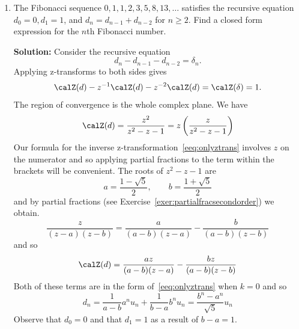 \documentclass[11pt,a4paper]{book}
\theoremstyle{plain}
\numberwithin{equation}{section}
\newcommand{\ints}{{\mathbb Z}}
\newcommand{\term}{\textbf}
\newenvironment{solution}{\begin{footnotesize}\textbf{Solution:}}{\end{footnotesize}}
\newcounter{test}
\newenvironment{excersizelist}{%
  \renewcommand*{\theenumi}{\thechapter.\arabic{enumi}}%
  \newcommand\itemadvanced{\stepcounter{enumi}\item[$\ast$\, \theenumi.]}
  \begin{enumerate}
}{%
  \end{enumerate}
}
\begin{document}
\begin{excersizelist}
\item \label{exer:fibonacci} The Fibonacci sequence $0,1,1,2,3,5,8,13,\dots$ satisfies the recursive equation $d_0 = 0, d_1 = 1$, and $d_n = d_{n-1} + d_{n-2}$ for $n \geq 2$.  Find a closed form expression for the $n$th Fibonacci number.
\begin{solution}
Consider the recursive equation
\[
d_n - d_{n-1} - d_{n-2} = \delta_{n}.
\]
Applying z-transforms to both sides gives
\[
\calZ(d) - z^{-1} \calZ(d) - z^{-2} \calZ(d) = \calZ(\delta) = 1.
\]
The region of convergence is the whole complex plane.  We have
\[
\calZ(d) = \frac{z^2}{z^2 - z - 1} = z \left( \frac{z}{z^2 - z - 1} \right)
\]
Our formula for the inverse z-transformation~\eqref{eeq:onlyztrans} involves $z$ on the numerator and so applying partial fractions to the term within the brackets will be convenient.  The roots of $z^2 - z - 1$ are
\[
a = \frac{1-\sqrt{5}}{2}, \qquad b = \frac{1+\sqrt{5}}{2}
\]
and by partial fractions (see Exercise~\ref{exer:partialfracsecondorder}) we obtain.
\[
\frac{z}{(z-a)(z-b)} = \frac{a}{(a-b) (z-a)}-\frac{b}{(a-b) (z-b)}
\]
and so
\[
\calZ(d) = \frac{az}{(a-b) (z-a)}-\frac{bz}{(a-b) (z-b)}
\]
Both of these terms are in the form of~\eqref{eeq:onlyztrans} when $k=0$ and so
\[
d_n = \frac{1}{a-b} a^n u_n + \frac{1}{b-a} b^n u_n = \frac{b^n - a^n}{\sqrt{5}} u_n
\]
Observe that $d_0 = 0$ and that $d_1 = 1$ as a result of $b - a = 1$.
\end{solution}


\end{excersizelist}








\end{document}
